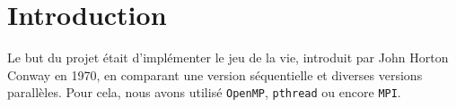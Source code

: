 \section{Introduction} %
\label{sec:introduction}
Le but du projet était d'implémenter le jeu de la vie, introduit par John Horton Conway en 1970, en comparant une version séquentielle et diverses versions parallèles. Pour cela, nous avons utilisé \texttt{OpenMP}, \texttt{pthread} ou encore \texttt{MPI}.

